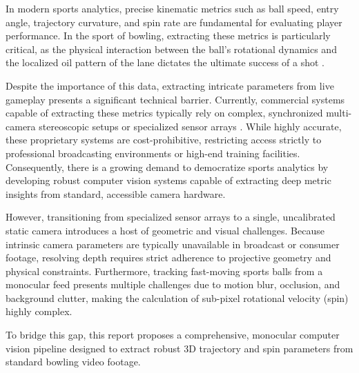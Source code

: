 In modern sports analytics, precise kinematic metrics such as ball speed, entry angle, trajectory curvature, and spin rate are fundamental for evaluating player performance. In the sport of bowling, extracting these metrics is particularly critical, as the physical interaction between the ball's rotational dynamics and the localized oil pattern of the lane dictates the ultimate success of a shot \cite{frohlich2004what}. 

Despite the importance of this data, extracting intricate parameters from live gameplay presents a significant technical barrier. Currently, commercial systems capable of extracting these metrics typically rely on complex, synchronized multi-camera stereoscopic setups or specialized sensor arrays \cite{gowda2017bringing}. While highly accurate, these proprietary systems are cost-prohibitive, restricting access strictly to professional broadcasting environments or high-end training facilities. Consequently, there is a growing demand to democratize sports analytics by developing robust computer vision systems capable of extracting deep metric insights from standard, accessible camera hardware. 

However, transitioning from specialized sensor arrays to a single, uncalibrated static camera introduces a host of geometric and visual challenges. Because intrinsic camera parameters are typically unavailable in broadcast or consumer footage, resolving depth requires strict adherence to projective geometry and physical constraints. Furthermore, tracking fast-moving sports balls from a monocular feed presents multiple challenges due to motion blur, occlusion, and background clutter, making the calculation of sub-pixel rotational velocity (spin) highly complex.

To bridge this gap, this report proposes a comprehensive, monocular computer vision pipeline designed to extract robust 3D trajectory and spin parameters from standard bowling video footage. 
